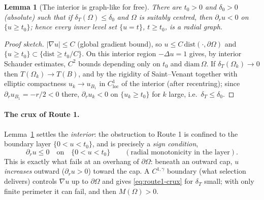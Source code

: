 \documentclass[11pt]{article}
\newtheorem{lemma}[theorem]{Lemma}
\theoremstyle{definition}
\newcommand{\Om}{\Omega}
\newcommand{\dT}{\delta_T}
\begin{document}
\begin{lemma}[The interior is graph-like for free]\label{lem:interior}
There are $t_0>0$ and $\delta_0>0$ \textup{(}absolute\textup{)} such that if
$\dT(\Om)\le\delta_0$ and $\Om$ is suitably centred, then
$\partial_r u<0$ on $\{u\ge t_0\}$; hence every inner level set
$\{u=t\}$, $t\ge t_0$, is a radial graph.
\end{lemma}

\begin{proof}[Proof sketch]
$|\nabla u|\le C$ (global gradient bound), so $u\le C\,\mathrm{dist}
(\cdot,\partial\Om)$ and $\{u\ge t_0\}\subset\{\mathrm{dist}\ge t_0/C\}$.
On this interior region $-\Delta u=1$ gives, by interior Schauder
estimates, $C^{2}$ bounds depending only on $t_0$ and $\mathrm{diam}\,\Om$.
If $\dT(\Om_k)\to0$ then $T(\Om_k)\to T(B)$, and by the rigidity of
Saint--Venant together with elliptic compactness $u_k\to u_{B_1}$ in
$C^1_{\mathrm{loc}}$ of the interior \textup{(}after recentring\textup{)};
since $\partial_r u_{B_1}=-r/2<0$ there, $\partial_r u_k<0$ on
$\{u_k\ge t_0\}$ for $k$ large, i.e.\ $\dT\le\delta_0$.
\end{proof}

\paragraph{The crux of Route 1.} Lemma~\ref{lem:interior} settles the
\emph{interior}: the obstruction to Route 1 is confined to the boundary
layer $\{0<u<t_0\}$, and is precisely a \emph{sign condition},
\begin{equation}\label{eq:route1-crux}
   \partial_r u\le0\quad\text{on}\quad\{0<u<t_0\}
   \qquad(\text{radial monotonicity in the layer}).
\end{equation}
This is exactly what fails at an overhang of $\partial\Om$: beneath an
outward cap, $u$ \emph{increases} outward ($\partial_r u>0$) toward the cap.
A $C^{1,\gamma}$ boundary (what selection delivers) controls $\nabla u$ up
to $\partial\Om$ and gives \eqref{eq:route1-crux} for $\dT$ small; with only
finite perimeter it can fail, and then $M(\Om)>0$.
\end{document}
